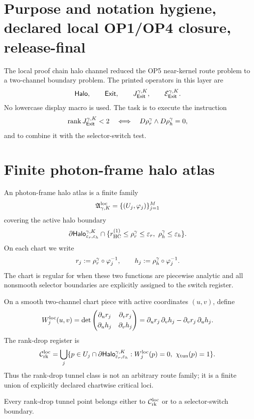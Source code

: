 \section{Purpose and notation hygiene, declared local OP1/OP4 closure, release-final}

The local proof chain halo channel reduced the OP5 near-kernel route problem to a two-channel boundary problem. The printed operators in this layer are
\[
\mathsf{Halo},\qquad \mathsf{Exit},\qquad J_{\mathsf{Exit}}^{\gamma,K},\qquad \mathcal E_{\mathsf{Exit}}^{\gamma,K} .
\]
No lowercase display macro is used. The task is to execute the instruction
\[
\operatorname{rank}J_{\mathsf{Exit}}^{\gamma,K}<2
\quad\Longleftrightarrow\quad
D\rho_{r}^{\gamma}\wedge D\rho_{h}^{\gamma}=0,
\]
and to combine it with the selector-switch test.

\section{Finite photon-frame halo atlas}

\begin{definition}
An photon-frame halo atlas is a finite family
\[
\mathfrak A_{\gamma,K}^{\mathrm{loc}}=\{(U_j,\varphi_j)\}_{j=1}^{M}
\]
covering the active halo boundary
\[
\partial \mathsf{Halo}_{\varepsilon_r,\varepsilon_h}^{\gamma,K}
\cap \{r_{\mathrm{HC}}^{(1)}\le \rho_{r}^{\gamma}\le \varepsilon_r,\ \rho_{h}^{\gamma}\le\varepsilon_h\}.
\]
On each chart we write
\[
r_j:=\rho_{r}^{\gamma}\circ\varphi_j^{-1},
\qquad
h_j:=\rho_{h}^{\gamma}\circ\varphi_j^{-1}.
\]
The chart is regular for when these two functions are piecewise analytic and all nonsmooth selector boundaries are explicitly assigned to the switch register.
\end{definition}

\begin{definition}
On a smooth two-channel chart piece with active coordinates \((u,v)\), define
\[
W_j^{\mathrm{loc}}(u,v)
=
\det
\begin{pmatrix}
\partial_u r_j & \partial_v r_j\\[1mm]
\partial_u h_j & \partial_v h_j
\end{pmatrix}
=
\partial_u r_j\,\partial_v h_j-
\partial_v r_j\,\partial_u h_j.
\]
The rank-drop register is
\[
\mathcal C_{\mathrm{rk}}^{\mathrm{loc}}=
\bigcup_j
\{p\in U_j\cap\partial \mathsf{Halo}_{\varepsilon_r,\varepsilon_h}^{\gamma,K}:
W_j^{\mathrm{loc}}(p)=0,\ \chi_{\mathrm{tun}}(p)=1\}.
\]
Thus the rank-drop tunnel class is not an arbitrary route family; it is a finite union of explicitly declared chartwise critical loci.
\end{definition}

\begin{lemma}
Every rank-drop tunnel point belongs either to \(\mathcal C_{\mathrm{rk}}^{\mathrm{loc}}\) or to a selector-switch boundary.
\end{lemma}

